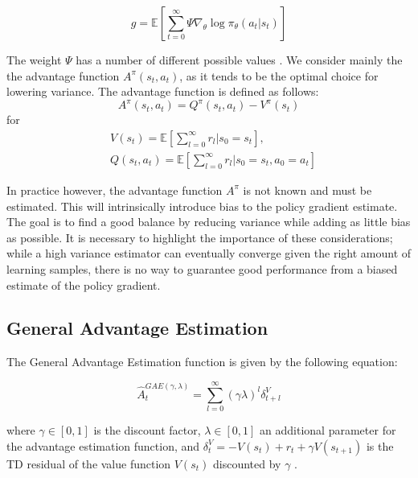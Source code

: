 \[
g = \mathbb{E}\left[\sum_{t=0}^{\infty} \Psi \nabla_{\theta}\log\pi_{\theta}(a_t|s_t)\right]
\]

The weight $\Psi$ has a number of different possible values \cite{schulman2015highdimensional}. We consider mainly the the advantage function $A^\pi(s_t, a_t)$, as it tends to be the optimal choice for lowering variance. The advantage function is defined as follows:
\begin{equation}
A^\pi(s_t,a_t) = Q^\pi(s_t, a_t) - V^\pi(s_t)
\end{equation}
for 
\begin{align*}
&V(s_t) = \mathbb{E}\left[\sum_{l=0}^{\infty} r_l | s_0 = s_t \right],\\
&Q(s_t, a_t) = \mathbb{E}\left[\sum_{l=0}^{\infty} r_l | s_0 = s_t, a_0 = a_t \right]
\end{align*}


In practice however, the advantage function $A^\pi$ is not known and must be estimated. This will intrinsically introduce bias to the policy gradient estimate. The goal is to find a good balance by reducing variance while adding as little bias as possible. It is necessary to highlight the importance of these considerations; while a high variance estimator can eventually converge given the right amount of learning samples, there is no way to guarantee good performance from a biased estimate of the policy gradient. 

\subsection{General Advantage Estimation}

The General Advantage Estimation\cite{schulman2015highdimensional} function is given by the following equation:

\begin{equation}
\hat{A}_t^{GAE(\gamma, \lambda)} = \sum_{l=0}^{\infty}(\gamma \lambda)^l \delta^V_{t+l}
\end{equation}

where $\gamma \in [0,1]$ is the discount factor, $\lambda \in [0,1]$ an additional parameter for the advantage estimation function, and $\delta^V_t = -V(s_t) + r_t + \gamma V(s_{t+1})$ is the TD residual of the value function $V(s_t)$ discounted by $\gamma$ \cite{sutton1998introduction}.

